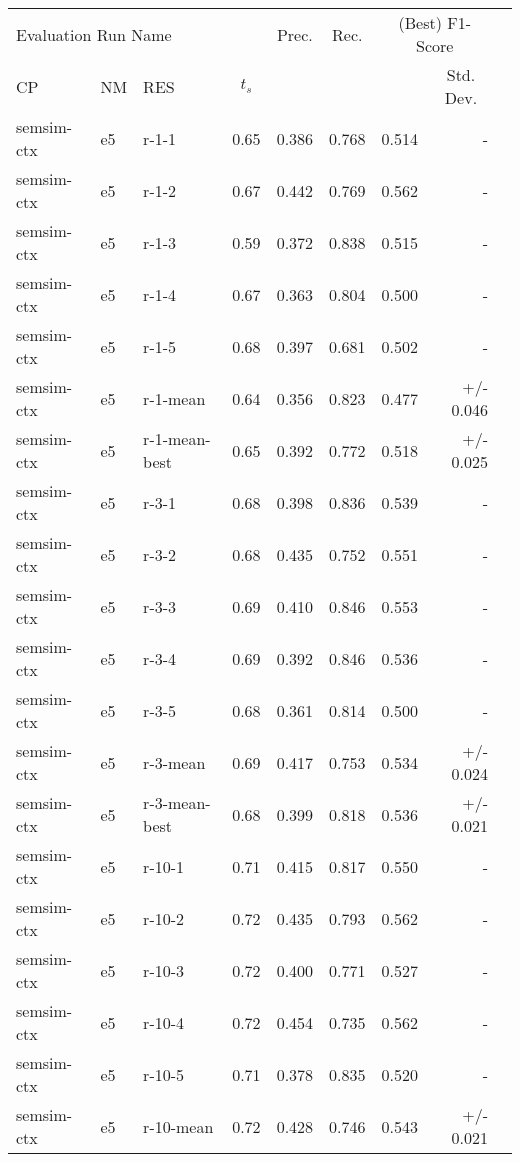 \begin{table}[H]
\centering
\begin{tabular}{lllrrrrrr}
\toprule
\multicolumn{4}{l}{Evaluation Run Name} & \multicolumn{1}{c}{Prec.} & \multicolumn{1}{c}{Rec.} & \multicolumn{2}{c}{(Best) F1-Score}\\
\cmidrule{1-4}\cmidrule{7-8}
\multicolumn{1}{l}{CP} & \multicolumn{1}{l}{NM} & \multicolumn{1}{l}{RES} & \multicolumn{1}{c}{\(t_s\)} & \multicolumn{3}{l}{} & \multicolumn{1}{c}{Std. Dev.} \\
\midrule
semsim-ctx & e5 & r-1-1 & 0.65 & 0.386 & 0.768 & 0.514 & - \\
semsim-ctx & e5 & r-1-2 & 0.67 & 0.442 & 0.769 & 0.562 & - \\
semsim-ctx & e5 & r-1-3 & 0.59 & 0.372 & 0.838 & 0.515 & - \\
semsim-ctx & e5 & r-1-4 & 0.67 & 0.363 & 0.804 & 0.500 & - \\
semsim-ctx & e5 & r-1-5 & 0.68 & 0.397 & 0.681 & 0.502 & - \\
semsim-ctx & e5 & r-1-mean & 0.64 & 0.356 & 0.823 & 0.477 & +/- 0.046 \\
semsim-ctx & e5 & r-1-mean-best & 0.65 & 0.392 & 0.772 & 0.518 & +/- 0.025 \\
\hline
semsim-ctx & e5 & r-3-1 & 0.68 & 0.398 & 0.836 & 0.539 & - \\
semsim-ctx & e5 & r-3-2 & 0.68 & 0.435 & 0.752 & 0.551 & - \\
semsim-ctx & e5 & r-3-3 & 0.69 & 0.410 & 0.846 & 0.553 & - \\
semsim-ctx & e5 & r-3-4 & 0.69 & 0.392 & 0.846 & 0.536 & - \\
semsim-ctx & e5 & r-3-5 & 0.68 & 0.361 & 0.814 & 0.500 & - \\
semsim-ctx & e5 & r-3-mean & 0.69 & 0.417 & 0.753 & 0.534 & +/- 0.024 \\
semsim-ctx & e5 & r-3-mean-best & 0.68 & 0.399 & 0.818 & 0.536 & +/- 0.021 \\
\hline
semsim-ctx & e5 & r-10-1 & 0.71 & 0.415 & 0.817 & 0.550 & - \\
semsim-ctx & e5 & r-10-2 & 0.72 & 0.435 & 0.793 & 0.562 & - \\
semsim-ctx & e5 & r-10-3 & 0.72 & 0.400 & 0.771 & 0.527 & - \\
semsim-ctx & e5 & r-10-4 & 0.72 & 0.454 & 0.735 & 0.562 & - \\
semsim-ctx & e5 & r-10-5 & 0.71 & 0.378 & 0.835 & 0.520 & - \\
semsim-ctx & e5 & r-10-mean & 0.72 & 0.428 & 0.746 & 0.543 & +/- 0.021 \\

\end{tabular}
\end{table}
